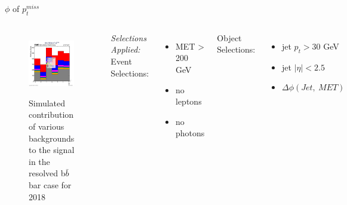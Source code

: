 \documentclass[10pt,xcolor=dvipsnames]{beamer}
\begin{document}
\begin{frame}[fragile]{$\phi $ of $p^{miss}_t$ }
  \begin{columns}
    \begin{figure}
      \centering
      \includegraphics[width=1\textwidth]{../Backgrounds/plots/SR_Resolved_Backgrounds_met_phi_hist_Combined.png}
      \label{contribution}
      \caption{Simulated contribution of various backgrounds to the signal in the resolved b$ \bar{b} $ bar case for 2018}
    \end{figure}
    \textit{Selections Applied:} \\
    Event Selections:
    \begin{itemize}
      \raggedright 
      \tiny
      \item {MET > 200 GeV}
      \item {no leptons}
      \item {no photons}
    \end{itemize}
    Object Selections:
    \begin{itemize}
      \raggedright 
      \tiny
      \item {jet $p_t > 30 $ GeV}
      \item {jet $| \eta | < 2.5 $}
      \item {$\Delta \phi (Jet, \ MET)$}

\end{itemize}
\end{columns}
\end{frame}
\end{document}
